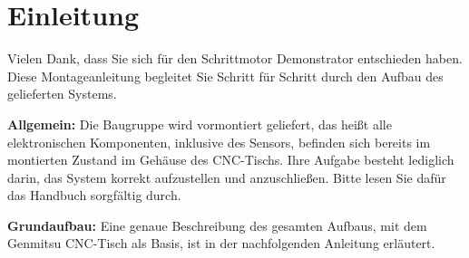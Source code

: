 % 
%
\chapter{Einleitung}

Vielen Dank, dass Sie sich für den Schrittmotor Demonstrator entschieden haben.
Diese Montageanleitung begleitet Sie Schritt für Schritt durch den Aufbau
des gelieferten Systems.

\vspace{0.5cm}
\textbf{Allgemein:}
	Die Baugruppe wird vormontiert geliefert, das heißt alle
	elektronischen Komponenten, inklusive des Sensors, befinden sich bereits im montierten
	Zustand im Gehäuse des CNC-Tischs. Ihre Aufgabe besteht lediglich darin,
	das System korrekt aufzustellen und anzuschließen.
	Bitte lesen Sie dafür das Handbuch sorgfältig durch.

\vspace{0.5cm}
\textbf{Grundaufbau:}
Eine genaue Beschreibung des gesamten Aufbaus, mit dem Genmitsu CNC-Tisch als Basis, ist in der nachfolgenden Anleitung erläutert.


	\vspace{2cm}
	
	
	
	